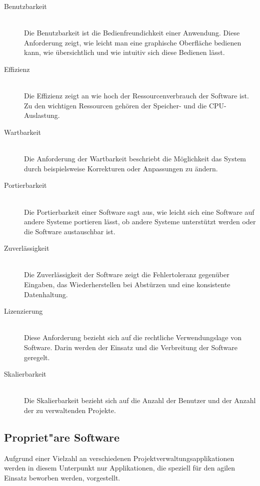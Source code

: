 \begin{description}
	\item[Benutzbarkeit]\hspace*{1em}\\
Die Benutzbarkeit ist die Bedienfreundichkeit einer Anwendung. Diese Anforderung zeigt, wie leicht man eine graphische Oberfläche bedienen kann, wie übersichtlich und wie intuitiv sich diese Bedienen lässt.
	\item[Effizienz]\hspace*{1em}\\
Die Effizienz zeigt an wie hoch der Ressourcenverbrauch der Software ist. Zu den wichtigen Ressourcen gehören der Speicher- und die CPU-Auslastung.
	\item[Wartbarkeit]\hspace*{1em}\\
Die Anforderung der Wartbarkeit beschriebt die Möglichkeit das System durch beispielsweise Korrekturen oder Anpassungen zu ändern.
	\item[Portierbarkeit]\hspace*{1em}\\
Die Portierbarkeit einer Software sagt aus, wie leicht sich eine Software auf andere Systeme portieren lässt, ob andere Systeme unterstützt werden oder die Software austauschbar ist.
	\item[Zuverlässigkeit]\hspace*{1em}\\
Die Zuverlässigkeit der Software zeigt die Fehlertoleranz gegenüber Eingaben, das Wiederherstellen bei Abstürzen und eine konsistente Datenhaltung. 
	\item[Lizenzierung]\hspace*{1em}\\
Diese Anforderung bezieht sich auf die rechtliche Verwendungslage von Software. Darin werden der Einsatz und die Verbreitung der Software geregelt.
	\item[Skalierbarkeit]\hspace*{1em}\\
Die Skalierbarkeit bezieht sich auf die Anzahl der Benutzer und der Anzahl der zu verwaltenden Projekte.
\end{description}

\subsection{Propriet"are Software}
Aufgrund einer Vielzahl an verschiedenen Projektverwaltungsapplikationen werden in diesem Unterpunkt nur Applikationen, die speziell für den agilen Einsatz beworben werden, vorgestellt.

